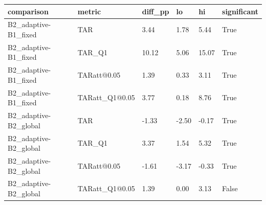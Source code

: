 \begin{tabular}{llllll}
\hline
comparison & metric & diff\_pp & lo & hi & significant \\
\hline
B2\_adaptive-B1\_fixed & TAR & 3.44 & 1.78 & 5.44 & True \\
B2\_adaptive-B1\_fixed & TAR\_Q1 & 10.12 & 5.06 & 15.07 & True \\
B2\_adaptive-B1\_fixed & TARatt@0.05 & 1.39 & 0.33 & 3.11 & True \\
B2\_adaptive-B1\_fixed & TARatt\_Q1@0.05 & 3.77 & 0.18 & 8.76 & True \\
B2\_adaptive-B2\_global & TAR & -1.33 & -2.50 & -0.17 & True \\
B2\_adaptive-B2\_global & TAR\_Q1 & 3.37 & 1.54 & 5.32 & True \\
B2\_adaptive-B2\_global & TARatt@0.05 & -1.61 & -3.17 & -0.33 & True \\
B2\_adaptive-B2\_global & TARatt\_Q1@0.05 & 1.39 & 0.00 & 3.13 & False \\
\hline
\end{tabular}
